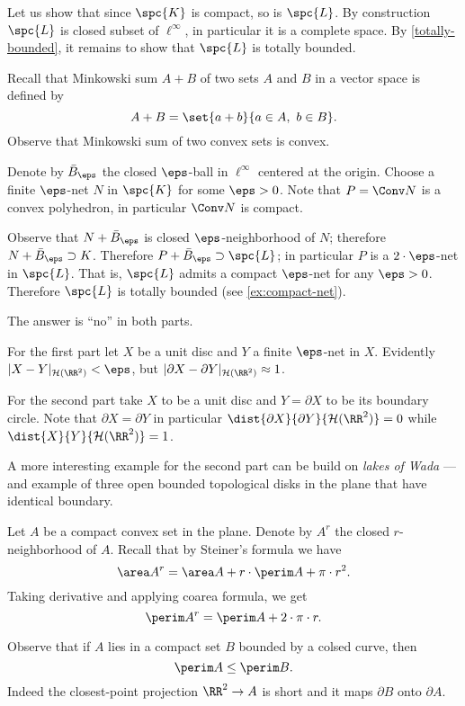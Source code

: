 Let us show that since $\spc{K}$ is compact, so is $\spc{L}$.
By construction $\spc{L}$ is closed subset of $\ell^\infty$, in particular it is a complete space.
By \ref{totally-bounded}, it remains to show that $\spc{L}$ is totally bounded.

Recall that Minkowski sum $A + B$ of two sets $A$ and $B$ in a vector space is defined by
\[A + B = \set{a+b}{a\in A,\ b\in B}.\]
Observe that Minkowski sum of two convex sets is convex.

Denote by $\bar B_\eps$ the closed $\eps$-ball in $\ell^\infty$ centered at the origin.
Choose a finite $\eps$-net $N$ in $\spc{K}$ for some $\eps>0$.
Note that $P=\Conv N$ is a convex polyhedron, in particular $\Conv N$ is compact.

Observe that $N+\bar B_\eps$ is closed $\eps$-neighborhood of $N$;
therefore $N+\bar B_\eps\supset K$.
Therefore $P+\bar B_\eps\supset \spc{L}$;
in particular $P$ is a $2\cdot\eps$-net in $\spc{L}$.
That is, $\spc{L}$ admits a compact $\eps$-net for any $\eps>0$.
Therefore $\spc{L}$ is totally bounded (see \ref{ex:compact-net}).



The answer is ``no'' in both parts.

For the first part let $X$ be a unit disc and $Y$ a finite $\eps$-net in $X$.
Evidently $|X-Y|_{\mathcal{H}(\RR^2)}<\eps$, 
but
$|\partial X-\partial Y|_{\mathcal{H}(\RR^2)}\approx 1$.

For the second part take $X$ to be a unit disc and $Y=\partial X$ to be its boundary circle.
Note that $\partial X=\partial Y$ in particular $\dist{\partial X}{\partial Y}{\mathcal{H}(\RR^2)}=0$ while $\dist{ X}{ Y}{\mathcal{H}(\RR^2)}=1$.
\qeds

A more interesting example for the second part can be build on \emph{lakes of Wada} --- and example of three open bounded topological disks in the plane that have identical boundary.

Let $A$ be a compact convex set in the plane.
Denote by $A^r$ the closed $r$-neighborhood of $A$.
Recall that by Steiner's formula we have
\[\area A^r=\area A+r\cdot\perim A+\pi\cdot r^2.\]
Taking derivative and applying coarea formula, we get 
\[\perim A^r=\perim A+2\cdot\pi\cdot r.\]

Observe that if $A$ lies in a compact set $B$ bounded by a colsed curve, then 
\[\perim A\le \perim B.\]
Indeed the closest-point projection $\RR^2\to A$ is short and it maps $\partial B$ onto $\partial A$.

